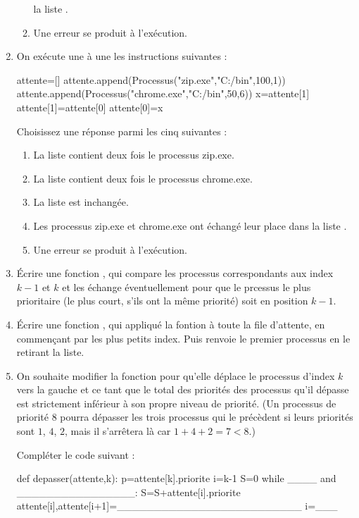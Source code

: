 \documentclass[11pt,a4paper,french,twoside]{VcCours}
\begin{document}
\begin{enumerate}
\begin{enumerate}
        la liste . 
        \item Une erreur se produit à l'exécution. 
    \end{enumerate}
    \item On exécute une à une les instructions suivantes :
\begin{Python}
attente=[]
attente.append(Processus("zip.exe","C:/bin",100,1))
attente.append(Processus("chrome.exe","C:/bin",50,6))
x=attente[1]
attente[1]=attente[0]
attente[0]=x
\end{Python}
    Choisissez une réponse parmi les cinq suivantes :
    \begin{enumerate}
        \item La liste  contient deux fois le processus zip.exe. 
        \item La liste  contient deux fois le processus chrome.exe. 
        \item La liste  est inchangée. 
        \item Les processus zip.exe et chrome.exe ont échangé leur place dans 
        la liste . 
        \item Une erreur se produit à l'exécution. 
    \end{enumerate}
    \item Écrire une fonction , qui compare les processus
    correspondants aux index $k-1$ et $k$ et les échange éventuellement pour que
    le prcessus le plus prioritaire (le plus court, s'ils ont la même priorité) 
    soit en position $k-1$.
    \item Écrire une fonction , qui appliqué la fontion 
     à toute la file d'attente, en commençant par les plus petits 
    index. Puis renvoie le premier processus en le retirant la liste.
    \item On souhaite modifier la fonction  pour qu'elle
    déplace le processus d'index $k$ vers la gauche et ce tant que le total des 
    priorités des processus qu'il dépasse est strictement inférieur 
    à son propre niveau de priorité. (Un processus de priorité $8$ pourra 
    dépasser les trois processus qui le précèdent si leurs priorités sont $1$, $4$, $2$, 
    mais il s'arrêtera là car $1+4+2=7<8$.)
    
    Compléter le code suivant :
\begin{Python}
def depasser(attente,k):
    p=attente[k].priorite
    i=k-1
    S=0
    while ____ and ________________:
        S=S+attente[i].priorite
        attente[i],attente[i+1]=_________________________
        i=___
\end{Python}
\end{enumerate}
\end{document}
